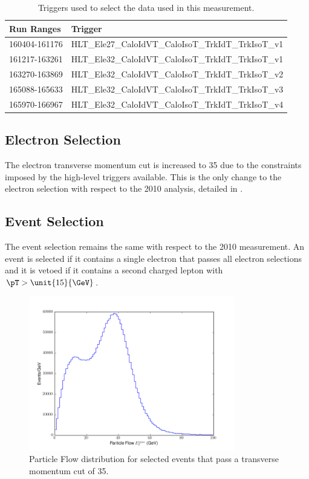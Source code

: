 \begin{table}[htbp]
  \begin{center}
    \leavevmode
     \begin{tabular}{ll} 
\toprule
      Run Ranges & Trigger  \\
     \midrule
     160404-161176 & HLT\_Ele27\_CaloIdVT\_CaloIsoT\_TrkIdT\_TrkIsoT\_v1  \\
     161217-163261 & HLT\_Ele32\_CaloIdVT\_CaloIsoT\_TrkIdT\_TrkIsoT\_v1  \\
     163270-163869 & HLT\_Ele32\_CaloIdVT\_CaloIsoT\_TrkIdT\_TrkIsoT\_v2  \\
     165088-165633 & HLT\_Ele32\_CaloIdVT\_CaloIsoT\_TrkIdT\_TrkIsoT\_v3  \\
     165970-166967 & HLT\_Ele32\_CaloIdVT\_CaloIsoT\_TrkIdT\_TrkIsoT\_v4  \\
\bottomrule
     \end{tabular}
  \caption{Triggers used to select the data used in this measurement.}
  \label{tab:updatedtriggers}
   \end{center}
\end{table}

\subsection{Electron Selection}

The electron transverse momentum cut is increased to \unit{35}{\GeV} due to the
constraints imposed by the high-level triggers available.  This is the only
change to the electron selection with respect to the 2010 analysis, detailed in
.

\subsection{Event Selection}
The event selection remains the same with respect to the 2010 measurement.
An event is selected if it contains a single electron that passes all electron
selections and it is vetoed if it contains a second charged lepton with
$\pT>\unit{15}{\GeV}$.

\begin{figure}[htbp]
  \centering
  \includegraphics*[width=0.8\textwidth]{pfmet_update}
  \caption{Particle Flow \ETm distribution for selected events that pass a
transverse momentum cut of {\unit{35}{\GeV}}.}
  \label{fig:pfmet}
\end{figure}

